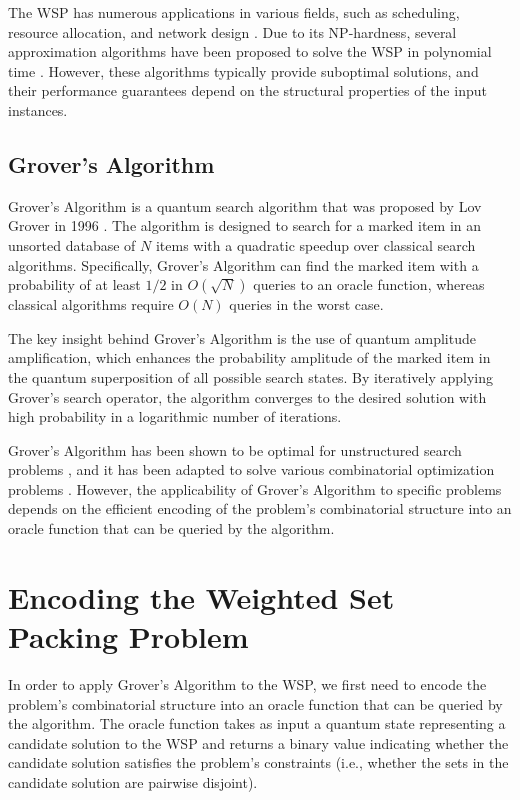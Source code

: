 The WSP has numerous applications in various fields, such as scheduling, resource allocation, and network design \cite{korte2000combinatorial}. Due to its NP-hardness, several approximation algorithms have been proposed to solve the WSP in polynomial time \cite{hochbaum1997approximation}. However, these algorithms typically provide suboptimal solutions, and their performance guarantees depend on the structural properties of the input instances.

\subsection{Grover's Algorithm}

Grover's Algorithm is a quantum search algorithm that was proposed by Lov Grover in 1996 \cite{grover1996fast}. The algorithm is designed to search for a marked item in an unsorted database of $N$ items with a quadratic speedup over classical search algorithms. Specifically, Grover's Algorithm can find the marked item with a probability of at least $1/2$ in $O(\sqrt{N})$ queries to an oracle function, whereas classical algorithms require $O(N)$ queries in the worst case.

The key insight behind Grover's Algorithm is the use of quantum amplitude amplification, which enhances the probability amplitude of the marked item in the quantum superposition of all possible search states. By iteratively applying Grover's search operator, the algorithm converges to the desired solution with high probability in a logarithmic number of iterations.

Grover's Algorithm has been shown to be optimal for unstructured search problems \cite{bennett1997strengths}, and it has been adapted to solve various combinatorial optimization problems \cite{brassard2002quantum, durr1996quantum}. However, the applicability of Grover's Algorithm to specific problems depends on the efficient encoding of the problem's combinatorial structure into an oracle function that can be queried by the algorithm.

\section{Encoding the Weighted Set Packing Problem}\label{sec:encoding}

In order to apply Grover's Algorithm to the WSP, we first need to encode the problem's combinatorial structure into an oracle function that can be queried by the algorithm. The oracle function takes as input a quantum state representing a candidate solution to the WSP and returns a binary value indicating whether the candidate solution satisfies the problem's constraints (i.e., whether the sets in the candidate solution are pairwise disjoint).


